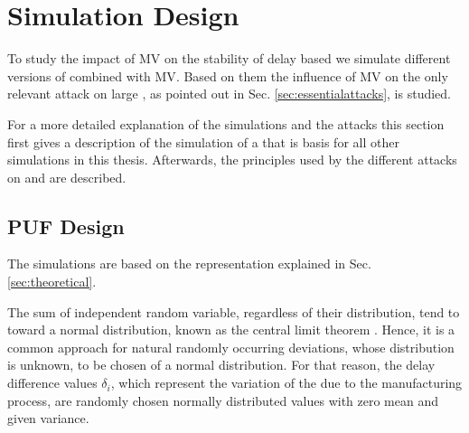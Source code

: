 \chapter{Simulation Design}
\label{cap:simulationdesign}

To study the impact of \ac{MV} on the stability of delay based \pufs we simulate different versions of \apufs combined with \ac{MV}.
Based on them the influence of \ac{MV} on the only relevant attack on large \xpufs, as pointed out in Sec. \ref{sec:essentialattacks}, is studied.


For a more detailed explanation of the simulations and the attacks this section first gives a description of the simulation of a \apuf that is basis for all other \puf simulations in this thesis.
Afterwards, the principles used by the different attacks on \mpufs and \mxpufs are described.



\section{\ac{PUF} Design}
\label{sec:pufsimulation}

The \apuf simulations are based on the \apuf representation explained in Sec. \ref{sec:theoretical}.

The sum of independent random variable, regardless of their distribution, tend to toward a normal distribution, known as the central limit theorem \cite{2017CentralTheorem}.
Hence, it is a common approach for natural randomly occurring deviations, whose distribution is unknown, to be chosen of a normal distribution.
For that reason, the delay difference values $\delta_i$, which represent the variation of the \apuf due to the manufacturing process, are randomly chosen normally distributed values with zero mean and given variance. %

